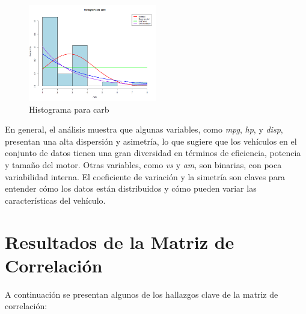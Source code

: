 \documentclass{article}
\begin{document}
\begin{enumerate}
		  \begin{figure}[H]
			\centering
			\includegraphics[width=0.5\textwidth]{Densidad/histograma_carb.png}
			\caption{Histograma para carb}
			\label{fig:histograma_carb}
			\vspace{0.5cm}
		\end{figure}

\end{enumerate}
En general, el análisis muestra que algunas variables, como \textit{mpg}, \textit{hp}, y \textit{disp}, presentan una alta dispersión y asimetría, lo que sugiere que los vehículos en el conjunto de datos tienen una gran diversidad en términos de eficiencia, potencia y tamaño del motor. Otras variables, como \textit{vs} y \textit{am}, son binarias, con poca variabilidad interna. El coeficiente de variación y la simetría son claves para entender cómo los datos están distribuidos y cómo pueden variar las características del vehículo.


\section{Resultados de la Matriz de Correlación}
A continuación se presentan algunos de los hallazgos clave de la matriz de correlación:
\end{document}
